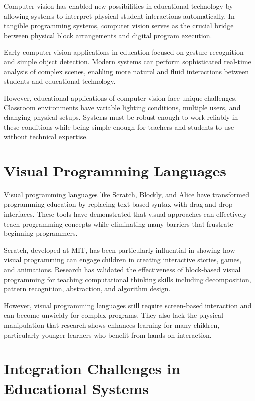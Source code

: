 Computer vision has enabled new possibilities in educational technology by allowing systems to interpret physical student interactions automatically. In tangible programming systems, computer vision serves as the crucial bridge between physical block arrangements and digital program execution.

Early computer vision applications in education focused on gesture recognition and simple object detection. Modern systems can perform sophisticated real-time analysis of complex scenes, enabling more natural and fluid interactions between students and educational technology.

However, educational applications of computer vision face unique challenges. Classroom environments have variable lighting conditions, multiple users, and changing physical setups. Systems must be robust enough to work reliably in these conditions while being simple enough for teachers and students to use without technical expertise.

\section{Visual Programming Languages}

Visual programming languages like Scratch, Blockly, and Alice have transformed programming education by replacing text-based syntax with drag-and-drop interfaces. These tools have demonstrated that visual approaches can effectively teach programming concepts while eliminating many barriers that frustrate beginning programmers.

Scratch, developed at MIT, has been particularly influential in showing how visual programming can engage children in creating interactive stories, games, and animations. Research has validated the effectiveness of block-based visual programming for teaching computational thinking skills including decomposition, pattern recognition, abstraction, and algorithm design.

However, visual programming languages still require screen-based interaction and can become unwieldy for complex programs. They also lack the physical manipulation that research shows enhances learning for many children, particularly younger learners who benefit from hands-on interaction.

\section{Integration Challenges in Educational Systems}

